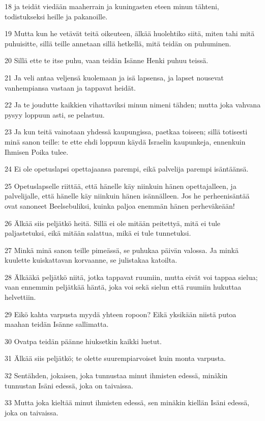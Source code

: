 \par 18 ja teidät viedään maaherrain ja kuningasten eteen minun tähteni, todistukseksi heille ja pakanoille.
\par 19 Mutta kun he vetävät teitä oikeuteen, älkää huolehtiko siitä, miten tahi mitä puhuisitte, sillä teille annetaan sillä hetkellä, mitä teidän on puhuminen.
\par 20 Sillä ette te itse puhu, vaan teidän Isänne Henki puhuu teissä.
\par 21 Ja veli antaa veljensä kuolemaan ja isä lapsensa, ja lapset nousevat vanhempiansa vastaan ja tappavat heidät.
\par 22 Ja te joudutte kaikkien vihattaviksi minun nimeni tähden; mutta joka vahvana pysyy loppuun asti, se pelastuu.
\par 23 Ja kun teitä vainotaan yhdessä kaupungissa, paetkaa toiseen; sillä totisesti minä sanon teille: te ette ehdi loppuun käydä Israelin kaupunkeja, ennenkuin Ihmisen Poika tulee.
\par 24 Ei ole opetuslapsi opettajaansa parempi, eikä palvelija parempi isäntäänsä.
\par 25 Opetuslapselle riittää, että hänelle käy niinkuin hänen opettajalleen, ja palvelijalle, että hänelle käy niinkuin hänen isännälleen. Jos he perheenisäntää ovat sanoneet Beelsebuliksi, kuinka paljoa enemmän hänen perheväkeään!
\par 26 Älkää siis peljätkö heitä. Sillä ei ole mitään peitettyä, mitä ei tule paljastetuksi, eikä mitään salattua, mikä ei tule tunnetuksi.
\par 27 Minkä minä sanon teille pimeässä, se puhukaa päivän valossa. Ja minkä kuulette kuiskattavan korvaanne, se julistakaa katoilta.
\par 28 Älkääkä peljätkö niitä, jotka tappavat ruumiin, mutta eivät voi tappaa sielua; vaan ennemmin peljätkää häntä, joka voi sekä sielun että ruumiin hukuttaa helvettiin.
\par 29 Eikö kahta varpusta myydä yhteen ropoon? Eikä yksikään niistä putoa maahan teidän Isänne sallimatta.
\par 30 Ovatpa teidän päänne hiuksetkin kaikki luetut.
\par 31 Älkää siis peljätkö; te olette suurempiarvoiset kuin monta varpusta.
\par 32 Sentähden, jokaisen, joka tunnustaa minut ihmisten edessä, minäkin tunnustan Isäni edessä, joka on taivaissa.
\par 33 Mutta joka kieltää minut ihmisten edessä, sen minäkin kiellän Isäni edessä, joka on taivaissa.
